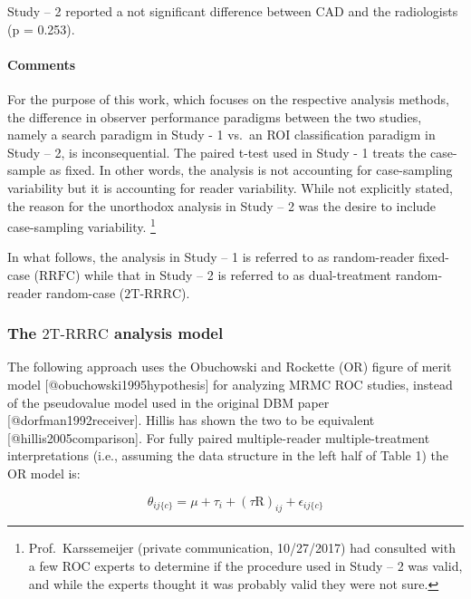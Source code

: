 \documentclass[
]{article}
\begin{document}
Study -- 2 reported a not significant difference between CAD and the radiologists (p = 0.253).

\hypertarget{standalone-cad-radiologists-comments}{%
\paragraph{Comments}\label{standalone-cad-radiologists-comments}}

For the purpose of this work, which focuses on the respective analysis methods, the difference in observer performance paradigms between the two studies, namely a search paradigm in Study - 1 vs.~an ROI classification paradigm in Study -- 2, is inconsequential. The paired t-test used in Study - 1 treats the case-sample as fixed. In other words, the analysis is not accounting for case-sampling variability but it is accounting for reader variability. While not explicitly stated, the reason for the unorthodox analysis in Study -- 2 was the desire to include case-sampling variability. \footnote{Prof.~Karssemeijer (private communication, 10/27/2017) had consulted with a few ROC experts to determine if the procedure used in Study -- 2 was valid, and while the experts thought it was probably valid they were not sure.}

In what follows, the analysis in Study -- 1 is referred to as random-reader fixed-case (\(\text{RRFC}\)) while that in Study -- 2 is referred to as dual-treatment random-reader random-case (\(\text{2T-RRRC}\)).

\hypertarget{standalone-cad-radiologists-2TRRRC-anlaysis}{%
\subsubsection{\texorpdfstring{The \(\text{2T-RRRC}\) analysis model}{The \textbackslash text\{2T-RRRC\} analysis model}}\label{standalone-cad-radiologists-2TRRRC-anlaysis}}

The following approach uses the Obuchowski and Rockette (OR) figure of merit model {[}@obuchowski1995hypothesis{]} for analyzing MRMC ROC studies, instead of the pseudovalue model used in the original DBM paper {[}@dorfman1992receiver{]}. Hillis has shown the two to be equivalent {[}@hillis2005comparison{]}. For fully paired multiple-reader multiple-treatment interpretations (i.e., assuming the data structure in the left half of Table 1) the OR model is:

\begin{equation}
\theta_{ij\{c\}}=\mu+\tau_i+\left ( \tau \text{R} \right )_{ij}+\epsilon_{ij\{c\}}
\label{eq:standalone-cad-model-theta-ij}
\end{equation}
\end{document}
